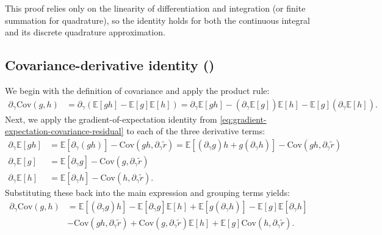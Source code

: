 \documentclass{article}
\begin{document}
%
This proof relies only on the linearity of differentiation and integration (or finite summation for quadrature), so the identity holds for both the continuous integral and its discrete quadrature approximation.

\subsection{Covariance-derivative identity ()}\label{app:proof-covariance-derivative}

We begin with the definition of covariance and apply the product rule:
%
\begin{align}
  \partial_{\gamma} \mathrm{Cov}(g, h) & = \partial_{\gamma} \left( \mathbb{E}[g h] - \mathbb{E}[g]\mathbb{E}[h] \right) = \partial_{\gamma} \mathbb{E}[g h] - (\partial_{\gamma} \mathbb{E}[g]) \mathbb{E}[h] - \mathbb{E}[g] (\partial_{\gamma} \mathbb{E}[h]).
\end{align}
%
Next, we apply the gradient-of-expectation identity from \cref{eq:gradient-expectation-covariance-residual} to each of the three derivative terms:
%
\begin{align}
  \partial_{\gamma} \mathbb{E}[g h] & = \mathbb{E}[\partial_{\gamma}(g h)] - \mathrm{Cov}(g h, \partial_{\gamma} \tilde{r}) = \mathbb{E}[(\partial_{\gamma} g) h + g (\partial_{\gamma} h)] - \mathrm{Cov}(g h, \partial_{\gamma} \tilde{r}) \\
  \partial_{\gamma} \mathbb{E}[g]   & = \mathbb{E}[\partial_{\gamma} g] - \mathrm{Cov}(g, \partial_{\gamma} \tilde{r})                                                                                                                       \\
  \partial_{\gamma} \mathbb{E}[h]   & = \mathbb{E}[\partial_{\gamma} h] - \mathrm{Cov}(h, \partial_{\gamma} \tilde{r}).
\end{align}
%
Substituting these back into the main expression and grouping terms yields:
%
\begin{align}
  \partial_{\gamma} \mathrm{Cov}(g, h) & = \mathbb{E}[(\partial_{\gamma} g) h] - \mathbb{E}[\partial_{\gamma} g] \mathbb{E}[h] + \mathbb{E}[g (\partial_{\gamma} h)] - \mathbb{E}[g] \mathbb{E}[\partial_{\gamma} h]           \\
                                       & - \mathrm{Cov}(g h, \partial_{\gamma} \tilde{r}) + \mathrm{Cov}(g, \partial_{\gamma} \tilde{r}) \mathbb{E}[h] + \mathbb{E}[g] \mathrm{Cov}(h, \partial_{\gamma} \tilde{r}). \nonumber
\end{align}
\end{document}
